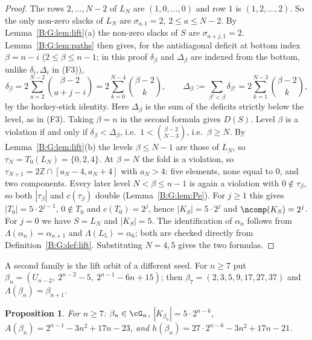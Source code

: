 \documentclass[11pt,a4paper]{article}
\newtheorem{proposition}[theorem]{Proposition}
\theoremstyle{definition}
\theoremstyle{remark}
\numberwithin{equation}{section}
\begin{document}
\begin{proof}
The rows $2,\dots,N-2$ of $L_N$ are $(1,0,\dots,0)$ and row $1$ is $(1,2,\dots,2)$. So the only
non-zero slacks of $L_N$ are $\sigma_{a,1}=2$, $2\le a\le N-2$. By Lemma~\ref{B:G:lem:lift}(a) the
non-zero slacks of $S$ are $\sigma_{a+j,1}=2$. Lemma~\ref{B:G:lem:paths} then gives, for the
antidiagonal deficit at bottom index $\beta=n-i$ ($2\le\beta\le n-1$; in this proof $\delta_\beta$ and $\Delta_\beta$ are indexed from the bottom, unlike $\delta_i,\Delta_i$ in (F3)),
\[
 \delta_\beta=2\sum_{a=2}^{N-2}\binom{\beta-2}{a+j-i}
 =2\sum_{k=0}^{N-4}\binom{\beta-2}{k},
 \qquad
 \Delta_\beta:=\sum_{\beta'<\beta}\delta_{\beta'}=2\sum_{k=1}^{N-3}\binom{\beta-2}{k},
\]
by the hockey-stick identity. Here $\Delta_\beta$ is the sum of the deficits strictly below the
level, as in (F3). Taking $\beta=n$ in the second formula gives $D(S)$. Level $\beta$ is a
violation if and only if $\delta_\beta<\Delta_\beta$, i.e.\ $1<\binom{\beta-2}{N-3}$, i.e.\
$\beta\ge N$. By Lemma~\ref{B:G:lem:lift}(b) the levels $\beta\le N-1$ are those of $L_N$, so
$\tau_N=T_0(L_N)=\{0,2,4\}$. At $\beta=N$ the fold is a violation, so
$\tau_{N+1}=2\mathbb{Z}\cap[a_N-4,a_N+4]$ with $a_N>4$: five elements, none equal to $0$, and two
components. Every later level $N<\beta\le n-1$ is again a violation with $0\notin\tau_\beta$, so
both $|\tau_\beta|$ and $c(\tau_\beta)$ double (Lemma~\ref{B:G:lem:Pe}). For $j\ge1$ this gives
$|T_0|=5\cdot2^{j-1}$, $0\notin T_0$ and $c(T_0)=2^{j}$, hence $|K_S|=5\cdot2^j$ and
$\ncomp(K_S)=2^j$. For $j=0$ we have $S=L_N$ and $|K_S|=5$. The identification of $\alpha_n$
follows from $\Lambda(\alpha_n)=\alpha_{n+1}$ and $\Lambda(L_5)=\alpha_6$; both are checked
directly from Definition~\ref{B:G:def:lift}. Substituting $N=4,5$ gives the two formulas.
\end{proof}

A second family is the lift orbit of a different seed. For $n\ge7$ put
$\beta_n=(U_{n-2},\ 2^{n-2}-5,\ 2^{n-1}-6n+15)$; then $\beta_7=(2,3,5,9,17,27,37)$ and
$\Lambda(\beta_n)=\beta_{n+1}$.

\begin{proposition}\label{B:G:prop:families}
For $n\ge7$: $\beta_n\in\cG_n$, $|K_{\beta_n}|=5\cdot2^{n-6}$,
$A(\beta_n)=2^{n-1}-3n^2+17n-23$, and $h(\beta_n)=27\cdot2^{n-6}-3n^2+17n-21$.
\end{proposition}
\end{document}
